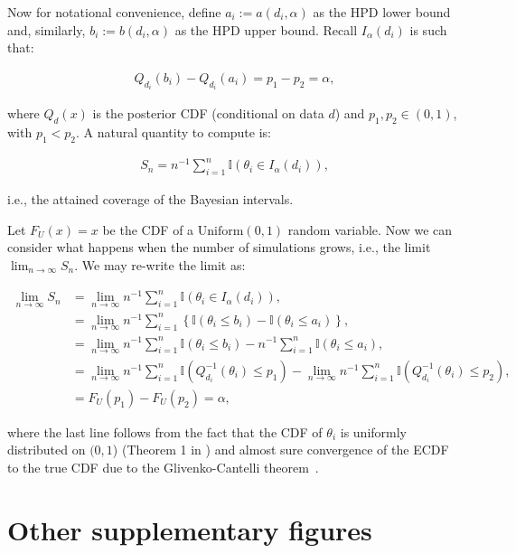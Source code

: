 \documentclass[oneside]{article}
\begin{document}
Now for notational convenience, define $a_i := a(d_i, \alpha)$ as the HPD lower bound and, similarly, $b_i := b(d_i, \alpha)$ as the HPD upper bound.
Recall $I_{\alpha}\left(d_i\right)$ is such that:


\begin{align*}
Q_{d_i}\left(b_i\right) - Q_{d_i}\left(a_i\right) = p_1 - p_2 = \alpha,
\end{align*}

\noindent where $Q_{d}(x)$ is the posterior CDF (conditional on data $d$) and $p_1, p_2 \in (0,1)$, with $p_1 < p_2$.
A natural quantity to compute is:

\begin{align*}
S_n = n^{-1}\sum_{i=1}^n \mathbb{I}\left(\theta_i \in I_{\alpha}\left(d_i\right) \right),
\end{align*}

\noindent i.e., the attained coverage of the Bayesian intervals.

Let $F_U(x) = x$ be the CDF of a $\operatorname{Uniform(0, 1)}$ random variable. 
Now we can consider what happens when the number of simulations grows, i.e., the limit $\lim_{n \to \infty} S_n$.
We may re-write the limit as:

\begin{align*}
\lim_{n \to \infty} S_n &= \lim_{n \to \infty} n^{-1}\sum_{i=1}^n \mathbb{I}\left(\theta_i \in I_{\alpha}\left(d_i\right) \right),\\
&=  \lim_{n \to \infty} n^{-1}\sum_{i=1}^n \left\{ \mathbb{I}\left(\theta_i \leq b_i \right) - \mathbb{I}\left(\theta_i \leq a_i \right) \right\},\\
&=  \lim_{n \to \infty} n^{-1}\sum_{i=1}^n \mathbb{I}\left(\theta_i \leq b_i \right) -  n^{-1}\sum_{i=1}^n\mathbb{I}\left(\theta_i \leq a_i \right),\\
&=  \lim_{n \to \infty} n^{-1}\sum_{i=1}^n \mathbb{I}\left(Q_{d_i}^{-1}\left(\theta_i\right) \leq p_1 \right) -   \lim_{n \to \infty} n^{-1}\sum_{i=1}^n\mathbb{I}\left(Q_{d_i}^{-1}\left(\theta_i\right) \leq p_2 \right),\\
&= F_U(p_1) - F_U(p_2) = \alpha,
\end{align*}

\noindent where the last line follows from the fact that the CDF of $\theta_i$ is uniformly distributed on $(0, 1$) (Theorem 1 in \citealp{Cook06}) and almost sure convergence of the ECDF to the true CDF due to the  Glivenko-Cantelli theorem~\cite[page 275]{Billingsley1986}.

\newpage
\section{Other supplementary figures}
\label{appendix::sec:supp_figures}
\end{document}
